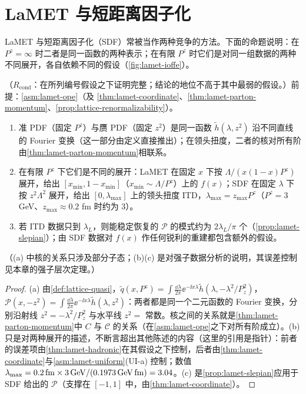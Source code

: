 \section{LaMET 与短距离因子化}\label{sec:lamet-sdf}

LaMET 与短距离因子化（SDF）常被当作两种竞争的方法。下面的命题说明：在 $P^z=\infty$ 时二者是同一函数的两种表示；在有限 $P^z$ 时它们是对同一组数据的两种不同展开，各自依赖不同的假设（\cref{fig:lamet-ioffe}）。

\begin{proposition}\label{prop:lamet-sdf}
（$R_{\mathrm{cond}}$：在所列编号假设之下证明完整；结论的地位不高于其中最弱的假设。）前提：\cref{asm:lamet-ope}（及 \cref{thm:lamet-coordinate}、\cref{thm:lamet-parton-momentum}、\cref{prop:lattice-renormalizability}）。
\begin{enumerate}[label=(\alph*),leftmargin=2em,itemsep=1pt,topsep=2pt]
\item 准 PDF（固定 $P^z$）与赝 PDF（固定 $z^2$）是同一函数 $\tilde h(\lambda,z^2)$ 沿不同直线的 Fourier 变换（这一部分由定义直接推出）；在领头扭度，二者的核对所有阶由\cref{thm:lamet-parton-momentum}相联系。
\item 在有限 $P^z$ 下它们是不同的展开：LaMET 在固定 $x$ 下按 $\Lambda/(x(1-x)P^z)$ 展开，给出 $[x_{\min},1-x_{\min}]$（$x_{\min}\sim\Lambda/P^z$）上的 $f(x)$；SDF 在固定 $\lambda$ 下按 $z^2\Lambda^2$ 展开，给出 $[0,\lambda_{\max}]$ 上的领头扭度 ITD，$\lambda_{\max}=z_{\max}P^z$（$P^z=3$ GeV、$z_{\max}\approx0.2$ fm 时约为 $3$）。
\item 若 ITD 数据只到 $\lambda_L$，则能稳定恢复的 $\mathcal P$ 的模式约为 $2\lambda_L/\pi$ 个（\cref{prop:lamet-slepian}）；由 SDF 数据对 $f(x)$ 作任何锐利的重建都包含额外的假设。
\end{enumerate}
（(a) 中核的关系只涉及部分子态；(b)(c) 是对强子数据分析的说明，其误差控制见本章的强子层次定理。）
\end{proposition}

\begin{proof}
(a) 由\cref{def:lattice-quasi}，$\tilde q(x,P^z)=\int\frac{\dd\lambda}{2\pi}\ee^{-\ii x\lambda}\tilde h(\lambda,-\lambda^2/P_z^2)$，$\mathcal P(x,-z^2)=\int\frac{\dd\lambda}{2\pi}\ee^{-\ii x\lambda}\tilde h(\lambda,z^2)$：两者都是同一个二元函数的 Fourier 变换，分别沿射线 $z^2=-\lambda^2/P_z^2$ 与水平线 $z^2=$ 常数。核之间的关系就是\cref{thm:lamet-parton-momentum}中 $C$ 与 $\mathcal C$ 的关系（在\cref{asm:lamet-ope}之下对所有阶成立）。(b) 只是对两种展开的描述，不断言超出其他陈述的内容（这里的引用是指针）：前者的误差项由\cref{thm:lamet-hadronic}在其假设之下控制，后者由\cref{thm:lamet-coordinate}与\cref{asm:lamet-uniform}(UI-a) 控制；数值 $\lambda_{\max}=0.2\,{\rm fm}\times3\,{\rm GeV}/(0.1973\,{\rm GeV\,fm})=3.04$。(c) 是\cref{prop:lamet-slepian}应用于 SDF 给出的 $\mathcal P$（支撑在 $[-1,1]$ 中，由\cref{thm:lamet-coordinate}）。
\end{proof}

